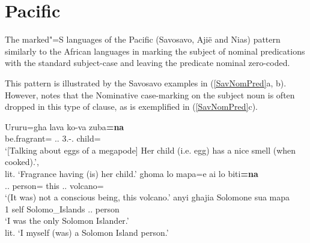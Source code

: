 


\section{Pacific}\label{NomPredPac}

The marked"=S languages of the Pacific (Savosavo, Aji\"e and Nias) pattern similarly to the African languages in marking the subject of nominal predications with the standard subject-case and leaving the predicate nominal zero-coded. 

This pattern is illustrated by the Savosavo examples in (\ref{SavNomPred}a, b). 
However, \citet[212]{Wegener:2008} notes that the Nominative
case-marking on the subject noun is often dropped in this type of clause, as is exemplified in
(\ref{SavNomPred}c).%
\enlargethispage{\baselineskip}

\begin{exe}\ex\label{SavNomPred}
\begin{xlist}
\ex\gll Ururu=gha lava ko-va zuba\textbf{=na}\\
be.fragrant=\pl{} \propr{}.\sg{}.\mas{} 3\sg{}.\fem{}-\gen{}.\mas{} child=\nom{}\\
\glt `[Talking about eggs of a megapode] Her child (i.e. egg) has a nice smell (when
cooked).',\\
lit. `Fragrance having (is) her child.'
\ex\gll ghoma lo mapa=e  ai lo biti\textbf{=na}\\
\Neg{} \deter{}.\sg{}.\mas{} person=\emphat{} this \deter{}.\sg{}.\mas{} volcano=\nom{}\\
\glt `(It was) not a conscious being, this volcano.'
\ex\gll  anyi ghajia Solomone sua mapa\\
1\sg{} self Solomo\_Islands \att{}.\sg{}.\mas{} person\\
\glt `I was the only Solomon Islander.'\\\nopagebreak[4]
lit. `I myself (was) a Solomon Island person.'
\end{xlist}
\end{exe}

